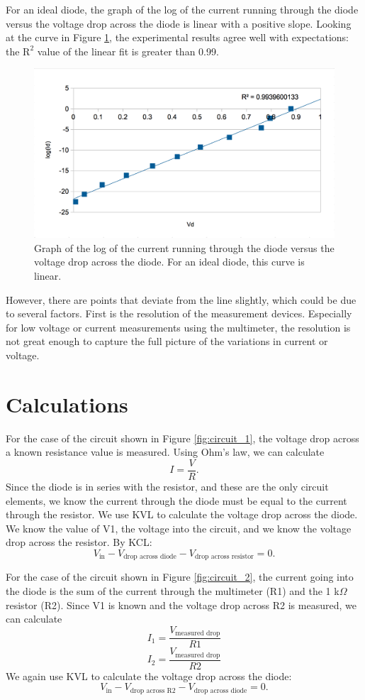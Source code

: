 \documentclass[12pt,letterpaper]{report}
\begin{document}
For an ideal diode, the graph of the log of the current running through the diode versus the voltage drop across the diode is linear with a positive slope. Looking at the curve in Figure \ref{fig:graph}, the experimental results agree well with expectations: the $\text{R}^2$ value of the linear fit is greater than 0.99.

\begin{figure}[H]
\centering
\includegraphics[width=0.9\linewidth, keepaspectratio=true]{lab3/lab3_graph.png}
\caption{Graph of the log of the current running through the diode versus the voltage drop across the diode. For an ideal diode, this curve is linear.}
\label{fig:graph}
\end{figure}

 However, there are points that deviate from the line slightly, which could be due to several factors. First is the resolution of the measurement devices. Especially for low voltage or current measurements using the multimeter, the resolution is not great enough to capture the full picture of the variations in current or voltage.

\section*{Calculations}

For the case of the circuit shown in Figure \ref{fig:circuit_1}, the voltage drop across a known resistance value is measured. Using Ohm's law, we can calculate
$$
I = \frac{V}{R}.
$$
Since the diode is in series with the resistor, and these are the only circuit elements, we know the current through the diode must be equal to the current through the resistor. 
We use KVL to calculate the voltage drop across the diode. We know the value of V1, the voltage into the circuit, and we know the voltage drop across the resistor. By KCL:
$$
V_{\text{in}} - V_{\text{drop across diode}} - V_{\text{drop across resistor}} = 0.
$$

For the case of the circuit shown in Figure \ref{fig:circuit_2}, the current going into the diode is the sum of the current through the multimeter (R1) and the 1 k$\Omega$ resistor (R2). Since V1 is known and the voltage drop across R2 is measured, we can calculate
$$
I_1 = \frac{V_{\text{measured drop}}}{R1}
$$
$$
I_2 = \frac{V_{\text{measured drop}}}{R2}
$$
We again use KVL to calculate the voltage drop across the diode:
$$
V_{\text{in}} - V_{\text{drop across R2}} - V_{\text{drop across diode}} = 0.
$$
\end{document}
